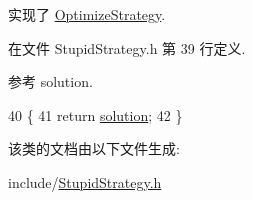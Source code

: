 实现了 \hyperlink{classOptimizeStrategy_a2ac1b1c33fa54a59e6f3a9daffcbf4eb}{Optimize\+Strategy}.



在文件 Stupid\+Strategy.\+h 第 39 行定义.



参考 solution.


\begin{DoxyCode}
40     \{
41         \textcolor{keywordflow}{return} \hyperlink{classes_8txt_aa43d5190bbc491d9c9134146e01a248e}{solution};
42     \}
\end{DoxyCode}


该类的文档由以下文件生成\+:\begin{DoxyCompactItemize}
\item 
include/\hyperlink{StupidStrategy_8h}{Stupid\+Strategy.\+h}\end{DoxyCompactItemize}
